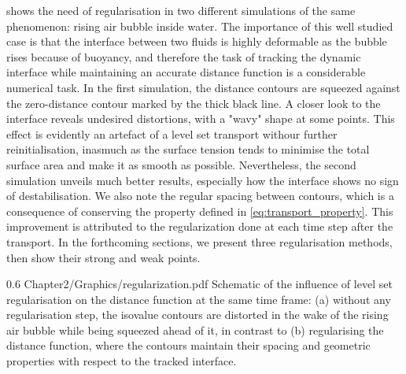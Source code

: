  shows the need of regularisation in two different 
simulations of the same phenomenon: rising air bubble inside
water. The importance of this well studied case \citep{sussman_level_1994,hysing_quantitative_2009}
is that the interface between two fluids is highly deformable
as the bubble rises because of buoyancy, and therefore the task of tracking the 
dynamic interface while maintaining an accurate distance function
is a considerable numerical task. In the first simulation, the distance contours 
are squeezed against the zero-distance contour marked by the 
thick black line. A closer look to the interface reveals undesired distortions, with a 
"wavy" shape at some points. This effect is evidently an artefact
of a level set transport withour further reinitialisation, inasmuch 
as the surface tension tends to minimise the total surface area and make it as smooth
as possible. Nevertheless, the second simulation unveils much better results, especially 
how the interface shows no sign of destabilisation. We also note the regular spacing between contours,
which is a consequence of conserving the property defined in \cref{eq:transport_property}.
This improvement is attributed to the regularization done at each time step after the transport.
In the forthcoming sections, we present three regularisation methods, then show their strong and weak points.
\begin{figureth}
{0.6}
{Chapter2/Graphics/regularization.pdf}
{Schematic of the influence of level set regularisation on the distance function at the same time frame: 
(a) without any regularisation step, the isovalue contours are distorted in the wake of the rising air 
bubble while being squeezed ahead of it, 
in contrast to (b) regularising the distance function, where the contours maintain their spacing and geometric 
properties with respect to the tracked interface.}
\label{fig:reinit_influence}
\end{figureth}
%
